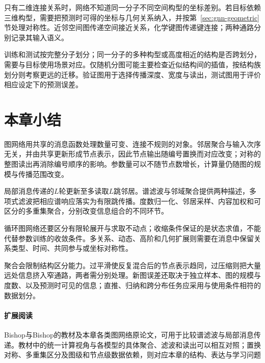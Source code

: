 只有二维连接关系时，网络不知道同一分子不同空间构型的坐标差别。若目标依赖三维构型，需要把预测时可得的坐标与几何关系纳入，并按第~\ref{sec:gnn-geometric}节处理对称性。近邻空间图传递空间接近关系，化学键图传递键连接；两种通路分别记录其输入语义。

训练和测试按完整分子划分；同一分子的多种构型或高度相近的结构是否跨划分，需要与目标使用场景对应。仅随机分图可能主要检查近似结构间的插值，按结构族划分则考察更远的迁移。验证图用于选择传播深度、宽度与读出，测试图用于评价相应设定下的预测误差。

\section{本章小结}
\label{sec:gnn-summary}

图网络用共享的消息函数处理数量可变、连接不规则的对象。邻居聚合与输入次序无关，并由共享更新形成节点表示，因此节点输出随编号置换而对应改变；对称的整图读出再消除编号顺序的影响。参数量可以不随节点数增长，计算量仍随图的规模与传播范围改变。

局部消息传递的$L$轮更新至多读取$L$跳邻居。谱滤波与邻域聚合提供两种描述，多项式滤波把相应谱响应落实为有限跳传播。度数归一化、邻居采样、内容加权和可区分的多重集聚合，分别改变信息组合的不同环节。

循环图网络还要区分有限轮展开与求取不动点；收缩条件保证的是状态求值，不能代替参数训练的收敛条件。多关系、动态、高阶和几何扩展则需要在消息中保留关系类型、时间、共同参与或坐标对称性。

聚合会限制结构区分能力。过平滑使反复混合后的节点表示趋同，过压缩则把大量远处信息挤入窄通路，两者需分别处理。新图误差还取决于独立样本、图的规模与度数、以及预测时可见的信息；直推、归纳和跨分布任务应采用与使用条件相符的数据划分。

\paragraph{扩展阅读}
Bishop与Bishop的教材及本章各类图网络原论文，可用于比较谱滤波与局部消息传递。教材中的统一计算视角与各模型的具体聚合、滤波和读出可以相互对照；置换对称、多重集区分及图级和节点级数据依赖，则对应本章的结构、表达与学习问题
